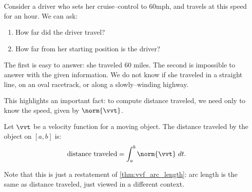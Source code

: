 Consider a driver who sets her cruise--control to 60mph, and travels at this speed for an hour. We can ask:
\begin{enumerate}
	\item How far did the driver travel?
	\item	How far from her starting position is the driver?
\end{enumerate} 
The first is easy to answer: she traveled 60 miles. The second is impossible to answer with the given information. We do not know if she traveled in a straight line, on an oval racetrack, or along a slowly--winding highway.

This highlights an important fact: to compute distance traveled, we need only to know the speed, given by $\norm{\vvt}$.

{Let $\vvt$ be a velocity function for a moving object. The distance traveled by the object on $[a,b]$ is:
\[\text{distance traveled} = \int_a^b \norm{\vvt}\ dt.\]}

Note that this is just a restatement of \autoref{thm:vvf_arc_length}: arc length is the same as distance traveled, just viewed in a different context.


